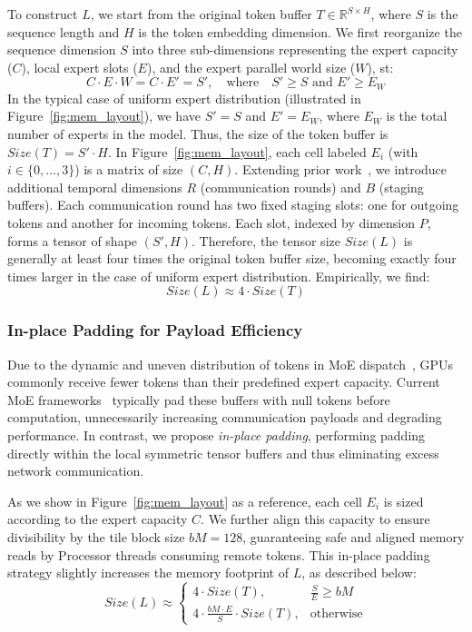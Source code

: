 To construct $L$, we start from the original token buffer $T \in \mathbb{R}^{S \times H}$, where $S$ is the
sequence length and $H$ is the token embedding dimension.
We first reorganize the sequence dimension $S$ into three sub-dimensions representing the expert capacity ($C$),
local expert slots ($E$), and the expert parallel world size ($W$), st:
\[
C \cdot E \cdot W = C \cdot E' = S', \quad\text{where}\quad S' \geq S \text{ and } E' \geq E_W
\]
In the typical case of uniform expert distribution (illustrated in Figure~\ref{fig:mem_layout}),
we have $S' = S$ and $E' = E_W$, where $E_W$ is the total number of experts in the model.
Thus, the size of the token buffer is $Size(T) = S' \cdot H$.
In Figure~\ref{fig:mem_layout}, each cell labeled $E_i$ (with $i \in \{0,\ldots,3\}$) is a matrix of size $(C, H)$.
Extending prior work~\cite{DBLP:conf/iclr/LepikhinLXCFHKS21, comet}, we introduce additional temporal dimensions
$R$ (communication rounds) and $B$ (staging buffers).
Each communication round has two fixed staging slots: one for outgoing tokens and another for incoming tokens.
Each slot, indexed by dimension $P$, forms a tensor of shape $(S', H)$.
Therefore, the tensor size $Size(L)$ is generally at least four times the original token buffer size,
becoming exactly four times larger in the case of uniform expert distribution. Empirically, we find:
\[
    Size(L) \approx 4 \cdot Size(T)
\]

\subsubsection{In-place Padding for Payload Efficiency}\label{subsubsec:payload}
Due to the dynamic and uneven distribution of tokens in MoE dispatch~\cite{bmamba}, GPUs commonly
receive fewer tokens than their predefined expert capacity.
Current MoE frameworks~\cite{pmlr-v162-rajbhandari22a} typically pad these buffers with null tokens before computation,
unnecessarily increasing communication payloads and degrading performance.
In contrast, we propose \emph{in-place padding}, performing padding directly within the local
symmetric tensor buffers and thus eliminating excess network communication.

As we show in Figure~\ref{fig:mem_layout} as a reference, each cell $E_i$ is sized according to the expert capacity $C$.
We further align this capacity to ensure divisibility by the tile block size $bM = 128$,
guaranteeing safe and aligned memory reads by Processor threads consuming remote tokens.
This in-place padding strategy slightly increases the memory footprint of $L$, as described below:
\[
    Size(L) \approx \begin{cases}
        4 \cdot Size(T), & \frac{S}{E} \geq bM \\[1ex]
        4 \cdot \frac{bM \cdot E}{S} \cdot Size(T), & \text{otherwise}
    \end{cases}
\]
